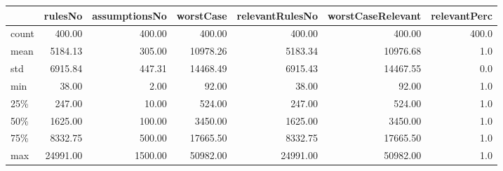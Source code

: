 \begin{tabular}{lrrrrrr}
\toprule
{} &   rulesNo &  assumptionsNo &  worstCase &  relevantRulesNo &  worstCaseRelevant &  relevantPerc \\
\midrule
count &    400.00 &         400.00 &     400.00 &           400.00 &             400.00 &         400.0 \\
mean  &   5184.13 &         305.00 &   10978.26 &          5183.34 &           10976.68 &           1.0 \\
std   &   6915.84 &         447.31 &   14468.49 &          6915.43 &           14467.55 &           0.0 \\
min   &     38.00 &           2.00 &      92.00 &            38.00 &              92.00 &           1.0 \\
25\%   &    247.00 &          10.00 &     524.00 &           247.00 &             524.00 &           1.0 \\
50\%   &   1625.00 &         100.00 &    3450.00 &          1625.00 &            3450.00 &           1.0 \\
75\%   &   8332.75 &         500.00 &   17665.50 &          8332.75 &           17665.50 &           1.0 \\
max   &  24991.00 &        1500.00 &   50982.00 &         24991.00 &           50982.00 &           1.0 \\
\bottomrule
\end{tabular}
